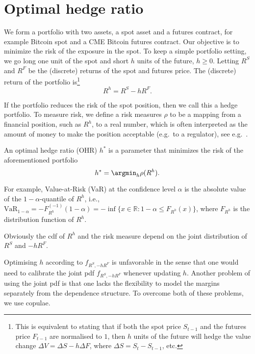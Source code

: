 \section{Optimal hedge ratio}
\label{sec:optimal-hedge-ratio}

We form a portfolio with two assets, a spot asset and a futures
contract, for example Bitcoin spot and a CME Bitcoin futures contract.
Our objective is to minimize the risk of the exposure in the spot.
To keep a simple portfolio setting, we go long one unit of the spot
and short $h$ units of the future, $h \geq 0$.
Letting $R^S$ and $R^F$ be the (discrete) returns of the spot and
futures price. The (discrete) return of the portfolio is\footnote{%
This is equivalent to stating that if both the spot price $S_{t-1}$
and the futures price $F_{t-1}$ are 
normalised to $1$, then $h$ units of the future will hedge the value
change $\Delta V = \Delta S - h \Delta F$, where $\Delta S =
S_t-S_{t-1}$, etc.
  }
\begin{equation*}
R^h = R^S -h R^F.
\end{equation*}


If the portfolio reduces the risk of the spot position, then
we call this a hedge portfolio.
To measure risk, we define a risk measures $\rho$ to be a mapping from
a financial position, such as $R^h$, to a real number, which is often
interpreted as the amount of money to make the position acceptable
(e.g.\ to a regulator), see e.g.\ \citep{Foellmer2002}. \medskip

An optimal hedge ratio (OHR) $h^*$ is a parameter that
minimizes the risk of the aforementioned portfolio
\begin{equation*}
h^* = \argmin_h \rho(R^h).
\end{equation*}

For example, Value-at-Risk (VaR) at the confidence level $\alpha$ is
the absolute value of the $1-\alpha$-quantile of $R^h$, i.e., $\text{VaR}_{1-\alpha} =
-F_{R^h}^{(-1)}(1-\alpha) = -\inf\{x \in \mathbb{R}: 1-\alpha \leq
F_{R^h}(x) \}$, where $F_{R^h}$ is the distribution function of
$R^h$. \medskip

Obviously the cdf of $R^h$ and the risk measure depend on the joint distribution of $R^S$ and $-hR^F$. \medskip

Optimising $h$ according to $f_{R^S,-hR^F}$ is unfavorable in the
sense that one would need to calibrate the joint pdf $f_{R^S,-hR^F}$
whenever updating $h$.
Another problem of using the joint pdf is that one lacks the
flexibility to model the margins separately from the dependence structure.
To overcome both of these problems, we use copulae. \medskip

